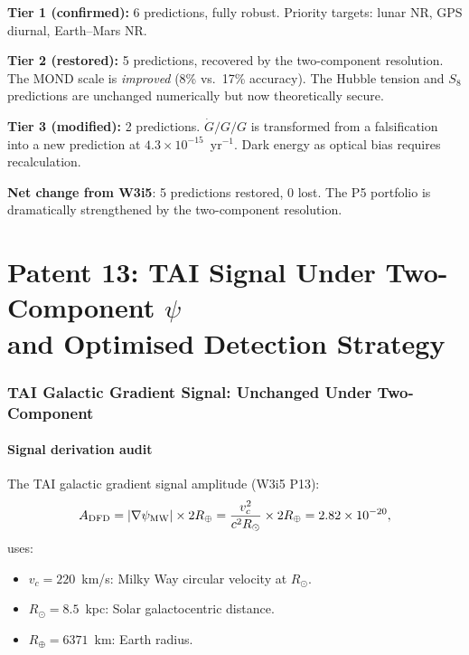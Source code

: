 \documentclass[11pt]{article}
\newcommand{\ee}[1]{\times 10^{#1}}
\newcommand{\Gdot}{\dot{G}/G}
\begin{document}
\begin{tcolorbox}[colback=green!5!white, colframe=green!60!black,
  title=\textbf{W3i6 P5 Scorecard: 11 of 13 Predictions Active}]
\textbf{Tier 1 (confirmed):} 6 predictions, fully robust. Priority
targets: lunar NR, GPS diurnal, Earth--Mars NR.

\textbf{Tier 2 (restored):} 5 predictions, recovered by the two-component
resolution. The MOND scale is \emph{improved} (8\% vs.\ 17\% accuracy).
The Hubble tension and $S_8$ predictions are unchanged numerically but
now theoretically secure.

\textbf{Tier 3 (modified):} 2 predictions. $\Gdot/G$ is transformed
from a falsification into a new prediction at $4.3\ee{-15}$~yr$^{-1}$.
Dark energy as optical bias requires recalculation.

\textbf{Net change from W3i5}: 5 predictions restored, 0 lost.
The P5 portfolio is dramatically strengthened by the two-component
resolution.
\end{tcolorbox}

\newpage

\part{Patent 13: TAI Signal Under Two-Component $\psi$\\
and Optimised Detection Strategy}
\label{part:P13}

\section{TAI Galactic Gradient Signal: Unchanged Under Two-Component}
\label{sec:TAI-twocomp}

\subsection{Signal derivation audit}

The TAI galactic gradient signal amplitude (W3i5 P13):
\begin{equation}
A_{\rm DFD} = |\nabla\psi_{\rm MW}|\times 2R_\oplus
= \frac{v_c^2}{c^2 R_\odot}\times 2R_\oplus = 2.82\ee{-20},
\label{eq:A-DFD-recall}
\end{equation}
uses:
\begin{itemize}[nosep]
\item $v_c = 220$~km/s: Milky Way circular velocity at $R_\odot$.
\item $R_\odot = 8.5$~kpc: Solar galactocentric distance.
\item $R_\oplus = 6371$~km: Earth radius.
\end{itemize}
\end{document}
